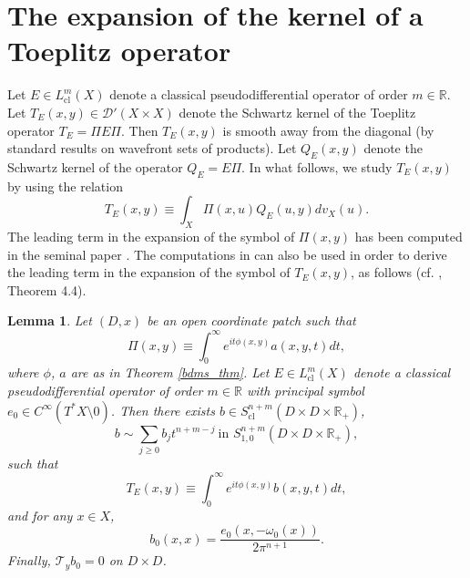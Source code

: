 \documentclass{article}
\newtheorem{lemma}[theorem]{Lemma}
\newcommand{\RR}{\mathbb R}
\newcommand{\mcd}{\mathcal D}
\newcommand{\mct}{\mathcal T}
\DeclareMathOperator{\cl}{cl}
\begin{document}
\section{The expansion of the kernel of a Toeplitz operator}\label{proof_sect}
%
Let $E\in L^m_{\cl}(X)$ denote a classical pseudodifferential operator of order $m \in \mathbb R$.
%
Let $T_E(x,y) \in \mcd'(X \times X)$ denote the Schwartz kernel of the Toeplitz operator $T_E = \Pi E \Pi$. Then $T_E(x,y)$ is smooth away from the diagonal (by standard results on wavefront sets of products). Let $Q_E(x,y)$ denote the Schwartz kernel of the operator $Q_E = E \Pi$. In what follows, we study $T_E(x,y)$ by using the relation
\begin{equation}\label{kern_comp} T_E(x,y) \equiv \int_X \Pi(x,u) Q_E(u, y) dv_X(u).\end{equation}
%
%
%
%
The leading term in the expansion of the symbol of $\Pi(x,y)$ has been computed in the seminal paper \cite{bdms}. The computations in \cite{bdms} can also be used in order to derive the leading term in the expansion of the symbol of $T_E(x,y)$, as follows (cf. \cite{gh2}, Theorem 4.4).
%
\begin{lemma}\label{lead_factor} Let $(D, x)$ be an open coordinate patch such that $$\Pi(x,y) \equiv \int_0^\infty e^{it \phi(x,y)} a(x,y,t) dt,$$
where $\phi$, $a$ are as in Theorem \ref{bdms_thm}. Let $E\in L^m_{\cl}(X)$ denote a classical pseudodifferential operator of order $m \in \mathbb R$ with principal symbol $e_0 \in C^\infty(T^*X \setminus 0)$. Then there exists $b \in S^{n+m}_{\cl}(D \times D \times \RR_+)$,
%
$$b \sim \sum_{j \ge 0} b_j t^{n+m-j} \ \text{in } S^{n+m}_{1,0}(D \times D \times \RR_+),$$
%
such that $$T_E(x,y) \equiv \int_0^\infty e^{it \phi(x,y)} b(x,y,t) dt,$$
and for any $x \in X$, $$b_0(x,x) = \frac{e_0(x, -\omega_0(x))}{2\pi^{n+1}}.$$
Finally, $\mct_y b_0 = 0$ on $D \times D$. \end{lemma}
%
\end{document}
